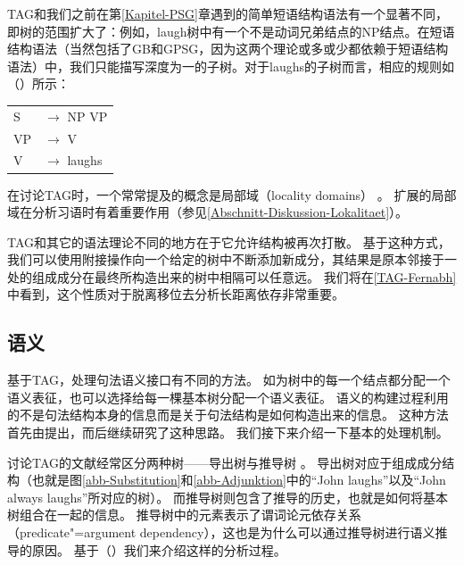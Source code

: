 TAG和我们之前在第\ref{Kapitel-PSG}章遇到的简单短语结构语法有一个显著不同，即树的范围扩大了：例如，laugh树中有一个不是动词兄弟结点的NP结点。在短语结构语法（当然包括了GB\indexgbc 和GPSG\indexgpsgc，因为这两个理论或多或少都依赖于短语结构语法）中，我们只能描写深度为一的子树。对于laughs的子树而言，相应的规则如（）所示：
\ea
\begin{tabular}[t]{@{}l@{ }l}
S  & $\to$ NP VP\\
VP & $\to$ V\\
V  & $\to$ laughs\\
\end{tabular}
\z
在讨论TAG时，一个常常提及的概念是局部域（{locality domains}）
。
扩展的局部域在分析习语时有着重要作用（参见\ref{Abschnitt-Diskussion-Lokalitaet}）。

TAG和其它的语法理论不同的地方在于它允许结构被再次打散。
基于这种方式，我们可以使用附接操作向一个给定的树中不断添加新成分，其结果是原本邻接于一处的组成成分在最终所构造出来的树中相隔可以任意远。
我们将在\ref{TAG-Fernabh}中看到，这个性质对于脱离移位去分析长距离依存非常重要。

\subsection{语义}

基于TAG，处理句法语义接口有不同的方法。
如为树中的每一个结点都分配一个语义表征，也可以选择给每一棵基本树分配一个语义表征。
语义的构建过程利用的不是句法结构本身的信息而是关于句法结构是如何构造出来的信息。
这种方法首先由\citet{CK98a}提出，而后\citet{KJ2003a}继续研究了这种思路。
我们接下来介绍一下基本的处理机制。

讨论TAG的文献经常区分两种树——导出树与推导树
。
导出树对应于组成成分结构（也就是图\ref{abb-Substitution}和\ref{abb-Adjunktion}中的“John laughs”以及“John always laughs”所对应的树）。
而推导树则包含了推导的历史，也就是如何将基本树组合在一起的信息。
推导树中的元素表示了谓词论元依存关系（predicate"=argument dependency），这也是为什么可以通过推导树进行语义推导的原因。
基于（）我们来介绍这样的分析过程。

